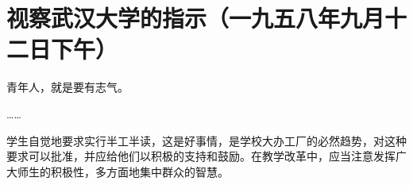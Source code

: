 \section[视察武汉大学的指示（一九五八年九月十二日下午）]{视察武汉大学的指示（一九五八年九月十二日下午）}


青年人，就是要有志气。

……

学生自觉地要求实行半工半读，这是好事情，是学校大办工厂的必然趋势，对这种要求可以批准，并应给他们以积极的支持和鼓励。在教学改革中，应当注意发挥广大师生的积极性，多方面地集中群众的智慧。


